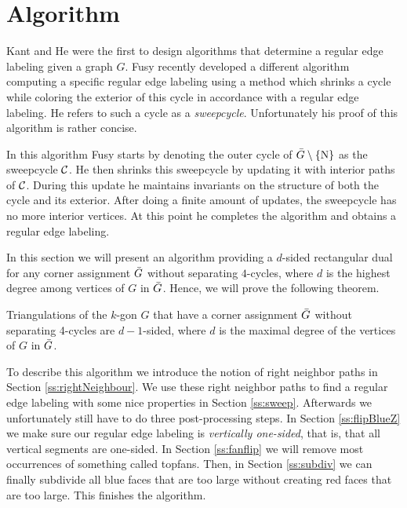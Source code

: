 
\section{Algorithm}
\thispagestyle{plain}
\label{s:algo}

  Kant and He \cite{Kant1997} were the first to design algorithms that determine a regular edge labeling given a graph $G$. Fusy \cite{Fusy2006} recently developed a different algorithm computing a specific regular edge labeling using a method which shrinks a cycle while coloring the exterior of this cycle in accordance with a regular edge labeling. He refers to such a cycle as a \emph{sweepcycle}. Unfortunately his proof of this algorithm is rather concise.

  In this algorithm Fusy starts by denoting the outer cycle of $\bar{G} \setminus \left\lbrace {\mathrm{N}} \right\rbrace$ as the sweepcycle $\mathcal{C}$. He then shrinks this sweepcycle by updating it with interior paths of $\mathcal{C}$. During this update he maintains invariants on the structure of both the cycle and its exterior.
  After doing a finite amount of updates, the sweepcycle has no more interior vertices. At this point he completes the algorithm and obtains a regular edge labeling.

  In this section we will present an algorithm providing a $d$-sided rectangular dual for any corner assignment $\bar{G}$ without separating $4$-cycles, where $d$ is the highest degree among vertices of $G$ in $\bar{G}$.  Hence, we will prove the following theorem.

  \begin{thrm}
  \label{th:dsided}
  Triangulations of the $k$-gon $G$ that have a corner assignment $\bar{G}$ without separating 4-cycles are $d-1$-sided, where $d$ is the maximal degree of the vertices of $G$ in $\bar{G}$.
  \end{thrm}

  To describe this algorithm we introduce the notion of right neighbor paths in Section \ref{ss:rightNeighbour}.  We use these right neighbor paths to find a regular edge labeling with some nice properties in Section \ref{ss:sweep}. Afterwards we unfortunately still have to do three post-processing steps. In Section \ref{ss:flipBlueZ} we make sure our regular edge labeling is \emph{vertically one-sided}, that is, that all vertical segments are one-sided. In Section \ref{ss:fanflip} we will remove most occurrences of something called topfans. Then, in Section \ref{ss:subdiv} we can finally subdivide all blue faces that are too large without creating red faces that are too large. This finishes the algorithm.
